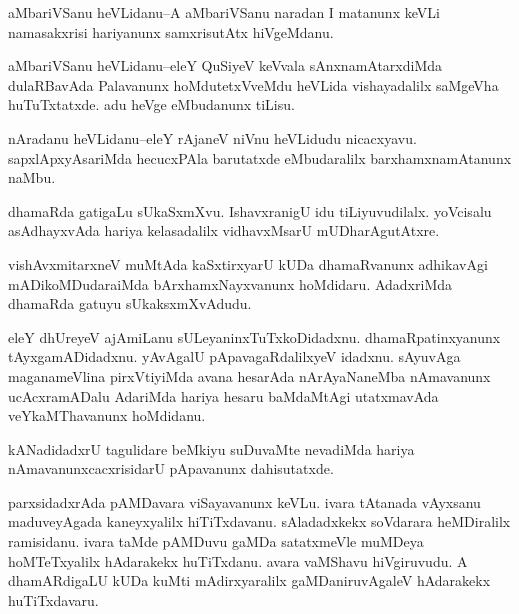 \documentclass{article}
\begin{document}

\begin{mn}%
aMbariVSanu heVLidanu--A aMbariVSanu naradan I matanunx keVLi namasakxrisi hariyanunx 
samxrisutAtx hiVgeMdanu.
\end{mn}

\begin{mn}%
aMbariVSanu heVLidanu--eleY QuSiyeV keVvala sAnxnamAtarxdiMda dulaRBavAda Palavanunx 
hoMdutetxVveMdu heVLida vishayadalilx saMgeVha  huTuTxtatxde. adu heVge eMbudanunx tiLisu.
\end{mn}

\begin{mn}%
nAradanu heVLidanu--eleY rAjaneV niVnu heVLidudu nicacxyavu. sapxlApxyAsariMda hecucxPAla 
barutatxde eMbudaralilx barxhamxnamAtanunx naMbu.
\end{mn}

\begin{mn}%
dhamaRda gatigaLu sUkaSxmXvu. IshavxranigU idu tiLiyuvudilalx. yoVcisalu asAdhayxvAda 
hariya kelasadalilx vidhavxMsarU mUDharAgutAtxre.
\end{mn}

\begin{mn}%
vishAvxmitarxneV muMtAda kaSxtirxyarU kUDa dhamaRvanunx adhikavAgi mADikoMDudaraiMda 
bArxhamxNayxvanunx hoMdidaru. AdadxriMda dhamaRda gatuyu sUkaksxmXvAdudu.
\end{mn}

\begin{mn}%
eleY dhUreyeV ajAmiLanu sULeyaninxTuTxkoDidadxnu. dhamaRpatinxyanunx tAyxgamADidadxnu. 
yAvAgalU pApavagaRdalilxyeV idadxnu. sAyuvAga maganameVlina pirxVtiyiMda avana hesarAda 
nArAyaNaneMba nAmavanunx ucAcxramADalu AdariMda hariya hesaru baMdaMtAgi utatxmavAda 
veYkaMThavanunx hoMdidanu.
\end{mn}

\begin{mn}%
kANadidadxrU tagulidare beMkiyu suDuvaMte nevadiMda hariya nAmavanunxcacxrisidarU 
pApavanunx dahisutatxde.
\end{mn}

\begin{mn}%
parxsidadxrAda pAMDavara viSayavanunx keVLu. ivara tAtanada vAyxsanu maduveyAgada 
kaneyxyalilx hiTiTxdavanu. sAladadxkekx soVdarara heMDiralilx ramisidanu. ivara taMde 
pAMDuvu gaMDa satatxmeVle muMDeya hoMTeTxyalilx hAdarakekx huTiTxdanu. avara vaMShavu 
hiVgiruvudu. A dhamARdigaLU kUDa kuMti mAdirxyaralilx gaMDaniruvAgaleV hAdarakekx 
huTiTxdavaru.
\end{mn}
\end{document}
